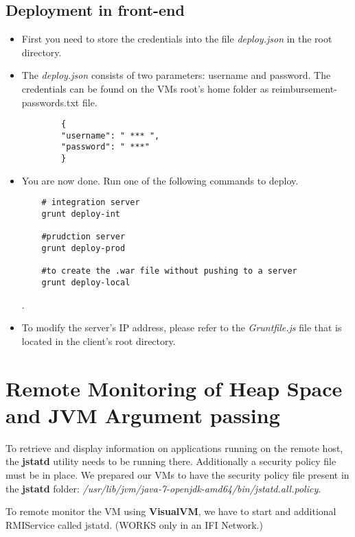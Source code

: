 \subsection{Deployment in front-end}
\label{deployment:frontend}
\begin{itemize}
	\item First you need to store the credentials into the file \textit{deploy.json} in the root directory.
	\item The \textit{deploy.json} consists of two parameters: username and password. The credentials can be found on the VMs root's home folder as reimbursement-passwords.txt file.
	\begin{lstlisting}
		{
		"username": " *** ",
		"password": " ***"
		}	\end{lstlisting}
	\item You are now done. Run one of the following commands to deploy.
	\begin{lstlisting}
	# integration server
	grunt deploy-int 
	
	#prudction server
	grunt deploy-prod
	
	#to create the .war file without pushing to a server
	grunt deploy-local	\end{lstlisting}.
	\item To modify the server's IP address, please refer to the \textit{Gruntfile.js} file that is located in the client's root directory.
\end{itemize}


\section{Remote Monitoring of Heap Space and JVM Argument passing}
\label{appendix:visualvm}
To retrieve and display information on applications running on the remote host, the \textbf{jstatd} utility needs to be running there. Additionally a security policy file must be in place. We prepared our VMs to have the security policy file present in the \textbf{jstatd} folder:  \textit{/usr/lib/jvm/java-7-openjdk-amd64/bin/jstatd.all.policy}.\par

To remote monitor the VM using \textbf{VisualVM}, we have to start and additional RMIService called jstatd. (WORKS only in an IFI Network.)

